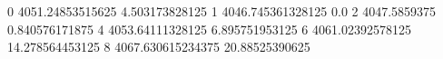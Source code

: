 0 4051.24853515625 4.503173828125
1 4046.745361328125 0.0
2 4047.5859375 0.840576171875
4 4053.64111328125 6.895751953125
6 4061.02392578125 14.278564453125
8 4067.630615234375 20.88525390625
